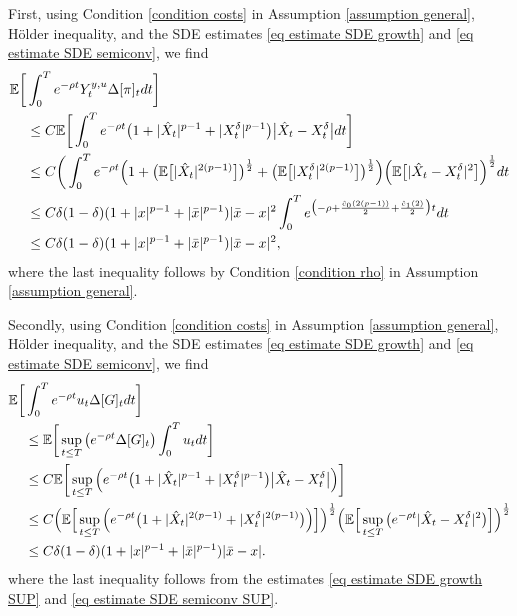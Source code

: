 \documentclass[11pt]{amsart}
\theoremstyle{plain}
\def \dd{{\rm d}}
\numberwithin{equation}{section}
\begin{document}
First, using Condition \ref{condition costs} in Assumption \ref{assumption general}, Hölder inequality, and the SDE estimates \eqref{eq estimate SDE growth} and \eqref{eq estimate SDE semiconv}, we find
\begin{equation}\label{eq delta pi}
    \begin{aligned}
\mathbb{E} \bigg[&\int_0^T e^{-\rho t}   Y_t^{y,u} \Delta [\pi] _t \dd t \bigg] \\
& \leq C \mathbb{E} \bigg[ \int_0^T e^{-\rho t} 
\big(1+ | \hat X_t |^{p-1} + | X_t^\delta  |^{p-1} \big) \big| \hat X_t- X^\delta_t \big| \dd t \bigg] \\
& \leq  C\bigg(     \int_0^T e ^{-\rho t} \Big( 1 + \big( \mathbb E \big[ |\hat X_t|^{2(p-1)} \big] \big)^{\frac12} + \big( \mathbb E \big[ | X ^\delta_t|^{2(p-1)} \big] \big)^{\frac12}  \Big) \Big( \mathbb E  \big[ | \hat X_t -  X ^\delta_t |^2 \big]  \Big)^{\frac12}  \dd t \\
& \leq C \delta (1-\delta) ( 1 +|{x}|^{p-1}+ |\bar{x}|^{p-1} )  |\bar{x} - x|^2 \int_0^T e^{\big( - \rho + \frac{ \hat c _0  (2(p-1))}{2} + \frac{\hat c _1 (2)}{2} \big) t} \dd t \\
& \leq C \delta (1-\delta) ( 1 +|{x}|^{p-1}+ |\bar{x}|^{p-1} )  |\bar{x} - x|^2, 
    \end{aligned}
\end{equation}
where the last inequality follows by  Condition \ref{condition rho} in Assumption \ref{assumption general}.

Secondly, using Condition \ref{condition costs} in Assumption \ref{assumption general}, Hölder inequality, and the SDE estimates \eqref{eq estimate SDE growth} and \eqref{eq estimate SDE semiconv}, we find
\begin{equation}\label{eq delta G}
    \begin{aligned}
        \mathbb{E} \bigg[&
        \int_0^T e^{-\rho t} u_t \Delta [G] _t \dd t \bigg] \\
    & \leq  \mathbb{E} \bigg[
    \sup_{t \leq T} \big( e^{-\rho t}  \Delta [G] _t \big) \int_0^T u_t \dd t \bigg] \\
&\leq   C \mathbb{E} \bigg[ \sup_{t \leq T} \Big( e^{-\rho t} 
\big(1+ |  \hat X_t |^{p-1} + | X_t^\delta  |^{p-1} \big) \big|  \hat X_t- X_t^\delta \big| \Big) \bigg] \\
 &\leq   C   \Big( \mathbb E \Big[ \sup_{t \leq T} \Big( e ^{-\rho t} \big( 1 +   | \hat X_t|^{2(p-1)}  +  | X_t^\delta |^{2(p-1)} \big) \Big) \Big] \Big)^{\frac12} \Big( \mathbb E \Big[ \sup_{t \leq T} \big( e ^{-\rho t} |  \hat X_t - X_t^\delta |^2 \big) \Big]  \Big)^{\frac12}\\
 & \leq C \delta (1-\delta) ( 1 +|{x}|^{p-1}+ |\bar{x}|^{p-1} )  |\bar{x} - x|.
\end{aligned}
\end{equation} 
where the last inequality follows from the estimates \eqref{eq estimate SDE growth SUP} and \eqref{eq estimate SDE semiconv SUP}.
\end{document}
